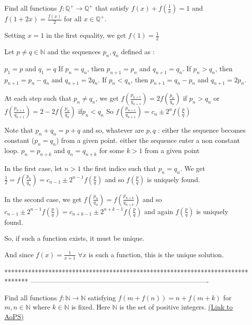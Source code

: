 \begin{solution}
	\begin{tcolorbox}Find all functions $ f: \mathbb{Q}^+\rightarrow\mathbb{Q}^+ $ that satisfy
$ f(x)+f(\frac{1}{x})=1 $ and $ f(1+2x)=\frac{f(x)}{2} $ for all $ x\in\mathbb{Q}^+ $.\end{tcolorbox}
Setting $x=1$ in the first equality, we get $f(1)=\frac 12$

Let $p\ne q\in\mathbb N$ and the sequences $p_n,q_n$ defined as :

$p_1=p$ and $q_1=q$
If $p_n=q_n$, then $p_{n+1}=p_n$ and $q_{n+1}=q_n$.
If $p_n>q_n$, then $p_{n+1}=p_n-q_n$ and $q_{n+1}=2q_n$.
If $p_n<q_n$, then $p_{n+1}=q_n-p_n$ and $q_{n+1}=2p_n$.

At each step such that $p_n\ne q_n$, we get $f(\frac{p_{n+1}}{q_{n+1}})=2f(\frac{p_n}{q_n})$ if $p_n>q_n$ or $f(\frac{p_{n+1}}{q_{n+1}})=2-2f(\frac{p_n}{q_n})$ if$p_n<q_n$
So $f(\frac{p_{n+1}}{q_{n+1}})=c_n\pm 2^{n}f(\frac pq)$

Note that $p_n+q_n=p+q$ and so, whatever are $p,q$ :
either the sequence becomes constant ($p_n=q_n$) from a given point.
either the sequence enter a non constant loop. $p_n=p_{n+k}$ and $q_n=q_{n+k}$ for some $k>1$ from a given point

In the first case, let $n>1$ the first indice such that $p_n=q_n$. We get $\frac 12=f(\frac{p_n}{q_n})=c_{n-1}\pm 2^{n-1}f(\frac pq)$ and so $f(\frac pq)$ is uniquely found.

In the second case, we get  $f(\frac{p_n}{q_n})=f(\frac{p_{n+k}}{q_{n+k}})$ and so $c_{n-1}\pm 2^{n-1}f(\frac pq)=c_{n+k-1}\pm 2^{n+k-1}f(\frac pq)$ and again $f(\frac pq)$ is uniquely found.

So, if such a function exists, it  must be unique.

And since $\boxed{f(x)=\frac 1{x+1}}$ $\forall x$ is such a function, this is the unique solution.
\end{solution}
*******************************************************************************
-------------------------------------------------------------------------------

\begin{problem}
	Find all functions $ f: \mathbb{N}\rightarrow\mathbb{N} $ satisfying $ f(m+f(n))=n+f(m+k) $ for $ m,n \in\mathbb{N} $ where $ k\in\mathbb{N} $ is fixed. 
Here $ \mathbb{N} $ is the set of positive integers.
	\flushright \href{https://artofproblemsolving.com/community/c6h536879}{(Link to AoPS)}
\end{problem}



